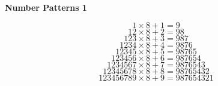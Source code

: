 \documentclass[12pt]{article}
\begin{document}
\begin{center}
\Large{\textbf{Number Patterns 1}}
\end{center}
\[1 \times 8 + 1 = 9\]
\[12 \times 8 + 2 = 98\]
\[123 \times 8 + 3 = 987\]
\[1234 \times 8 + 4 = 9876\]
\[12345 \times 8 + 5 = 98765\]
\[123456 \times 8 + 6 = 987654\]
\[1234567 \times 8 + 7 = 9876543\]
\[12345678 \times 8 + 8 = 98765432\]
\[123456789 \times 8 + 9 = 987654321\]
\end{document}
